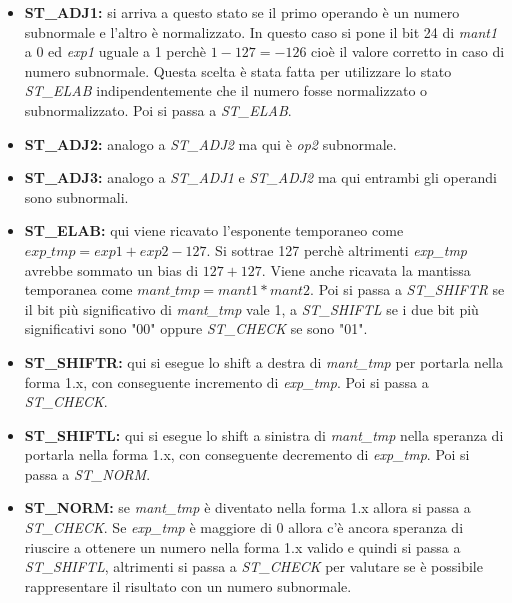 \documentclass[]{IEEEtran}
\begin{document}
\begin{itemize}
    \item \textbf{ST\_ADJ1:} si arriva a questo stato se il primo operando è un numero subnormale e l'altro è normalizzato. In questo caso si pone il bit 24 di \textit{mant1} a 0 ed \textit{exp1} uguale a 1 perchè $1-127=-126$ cioè il valore corretto in caso di numero subnormale. Questa scelta è stata fatta per utilizzare lo stato \textit{ST\_ELAB} indipendentemente che il numero fosse normalizzato o subnormalizzato. Poi si passa a \textit{ST\_ELAB}.
    \item \textbf{ST\_ADJ2:} analogo a \textit{ST\_ADJ2} ma qui è \textit{op2} subnormale.
    \item \textbf{ST\_ADJ3:} analogo a \textit{ST\_ADJ1} e \textit{ST\_ADJ2} ma qui entrambi gli operandi sono subnormali.
    \item \textbf{ST\_ELAB:} qui viene ricavato l'esponente temporaneo come $exp\_tmp = exp1 + exp2 - 127$. Si sottrae 127 perchè altrimenti \textit{exp\_tmp} avrebbe sommato un bias di $127+127$. Viene anche ricavata la mantissa temporanea come $mant\_tmp = mant1 * mant2$. Poi si passa a \textit{ST\_SHIFTR} se il bit più significativo di \textit{mant\_tmp} vale 1, a \textit{ST\_SHIFTL} se i due bit più significativi sono "00" oppure \textit{ST\_CHECK} se sono "01".
    \item \textbf{ST\_SHIFTR:} qui si esegue lo shift a destra di \textit{mant\_tmp} per portarla nella forma 1.x, con conseguente incremento di \textit{exp\_tmp}. Poi si passa a \textit{ST\_CHECK}.
    \item \textbf{ST\_SHIFTL:} qui si esegue lo shift a sinistra di \textit{mant\_tmp} nella speranza di portarla nella forma 1.x, con conseguente decremento di \textit{exp\_tmp}. Poi si passa a \textit{ST\_NORM}.
    \item \textbf{ST\_NORM:} se \textit{mant\_tmp} è diventato nella forma 1.x allora si passa a \textit{ST\_CHECK}. Se \textit{exp\_tmp} è maggiore di 0 allora c'è ancora speranza di riuscire a ottenere un numero nella forma 1.x valido e quindi si passa a \textit{ST\_SHIFTL}, altrimenti si passa a \textit{ST\_CHECK} per valutare se è possibile rappresentare il risultato con un numero subnormale.

\end{itemize}
\end{document}
